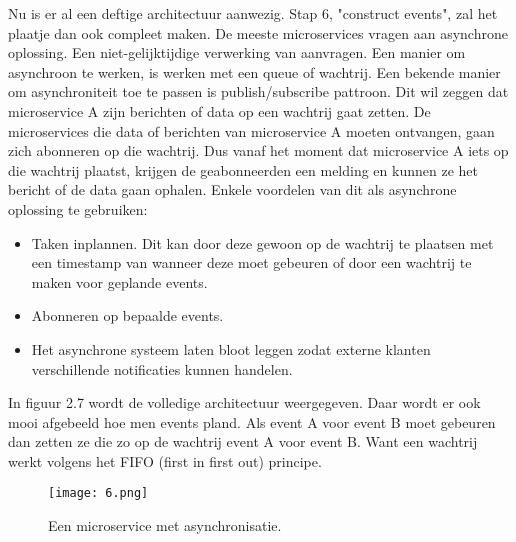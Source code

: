 Nu is er al een deftige architectuur aanwezig. Stap 6, "construct events", zal het plaatje dan ook compleet maken. De meeste microservices vragen aan asynchrone oplossing. Een niet-gelijktijdige verwerking van aanvragen. Een manier om asynchroon te werken, is werken met een queue of wachtrij. Een bekende manier om asynchroniteit toe te passen is publish/subscribe pattroon. Dit wil zeggen dat microservice A zijn berichten of data op een wachtrij gaat zetten. De microservices die data of berichten van microservice A moeten ontvangen, gaan zich abonneren op die wachtrij. Dus vanaf het moment dat microservice A iets op die wachtrij plaatst, krijgen de geabonneerden een melding en kunnen ze het bericht of de data gaan ophalen. Enkele voordelen van dit als asynchrone oplossing te gebruiken:
\begin{itemize}
	\item Taken inplannen. Dit kan door deze gewoon op de wachtrij te plaatsen met een timestamp van wanneer deze moet gebeuren of door een wachtrij te maken voor geplande events.
	\item Abonneren op bepaalde events.
	\item Het asynchrone systeem laten bloot leggen zodat externe klanten verschillende notificaties kunnen handelen.
\end{itemize}
In figuur 2.7 wordt de volledige architectuur weergegeven. Daar wordt er ook mooi afgebeeld hoe men events pland. Als event A voor event B moet gebeuren dan zetten ze die zo op de wachtrij event A voor event B. Want een wachtrij werkt volgens het FIFO (first in first out) principe.
\begin{figure}[h]
	\texttt{[image: 6.png]}
	\caption{Een microservice met asynchronisatie. \textcite{Benetis2016}}
	\centering
\end{figure}



